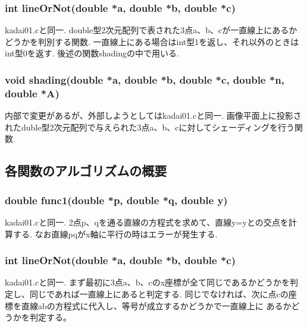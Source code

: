 \documentclass[a4j,dvipdfmx]{jsarticle}
\begin{document}
\subsubsection{int lineOrNot(double *a, double *b, double *c)}
kadai01.cと同一.
double型2次元配列で表された3点a、b、cが一直線上にあるかどうかを判別する関数.
一直線上にある場合はint型1を返し、それ以外のときはint型0を返す.
後述の関数shadingの中で用いる.

\subsubsection{void shading(double *a, double *b, double *c, double *n, double *A)}
内部で変更があるが、外部しようとしてはkadai01.cと同一.
画像平面上に投影されたduble型2次元配列で与えられた3点a、b、cに対してシェーディングを行う関数.

\subsection{各関数のアルゴリズムの概要}
\subsubsection{double func1(double *p, double *q, double y)}
kadai01.cと同一.
2点p、qを通る直線の方程式を求めて、直線y=yとの交点を計算する.
なお直線pqがx軸に平行の時はエラーが発生する.

\subsubsection{int lineOrNot(double *a, double *b, double *c)}
kadai01.cと同一.
まず最初に3点a、b、cのx座標が全て同じであるかどうかを判定し、同じであれば一直線上にあると判定する.
同じでなければ、次に点cの座標を直線abの方程式に代入し、等号が成立するかどうかで一直線上に
あるかどうかを判定する。
\end{document}
